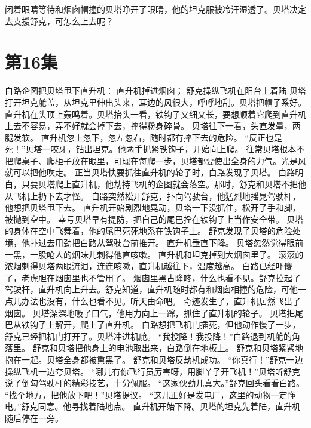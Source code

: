 \documentclass[a4paper,12pt,UTF8,twoside]{ctexbook}
\begin{document}
        闭着眼睛等待和烟囱帽撞的贝塔睁开了眼睛，他的坦克服被冷汗湿透了。贝塔决定去支援舒克，可怎么上去昵？   \chapter{第16集}   
        白路企图把贝塔甩下直升机： 
        直升机掉进烟囱； 
        舒克操纵飞机在阳台上着陆   
        贝塔打开坦克舱盖，从坦克里伸出头来，耳边的风很大，呼呼地刮。贝塔把帽子系好。 
        直升机在头顶上轰鸣着。贝塔抬头一看，铁钩子又细又长，要想顺着它爬到直升机上去不容易，弄不好就会掉下去，摔得粉身碎骨。 
        贝塔往下一看，头直发晕，两腿发软。 
        直升机忽上忽下，忽左忽右，随时都有摔下去的危险。 
        “反正也是死！”贝塔一咬牙，钻出坦克。他两手抓紧铁钩子，开始向上爬。 
        往常贝塔根本不把爬桌子、爬柜子放在眼里，可现在每爬一步，贝塔都要使出全身的力气。光是风就可以把他吹走。 
        正当贝塔快要抓往直升机的轮子时，白路发现了贝塔。 
        白路明白，只要贝塔爬上直升机，他劫持飞机的企图就会落空。那时，舒克和贝塔不把他从飞机上扔下去才怪。 
        自路突然松开舒克，扑向驾驶台，他猛烈地摇晃驾驶杆，他想把贝塔甩下去。 
        直升机开始剧烈地晃动，贝塔一下没抓住，松开了手和脚，被抛到空中。 
        幸亏贝塔早有提防，把自己的尾巴拴在铁钩子上当作安全带。 
        贝塔的身体在空中飞舞着，他的尾巴死死地系在铁钩子上。 
        舒克发现了贝塔的危险处境，他扑过去用劲把白路从驾驶台前推开。 
        直升机垂直下降。 
        贝塔忽然觉得眼前一黑，一股呛人的烟味儿刺得他直咳嗽。 
        直升机和坦克掉到大烟囱里了。 
        滚滚的浓烟刺得贝塔两眼流泪，连连咳嗽，直升机越往下，温度越高。 
        白路已经吓傻了，老虎胆在烟囱里也不管用了。 
        烟囱里黑古隆咚，什么也看不见。舒克拉起了驾驶杆，直升机向上升去。舒克知道，直升机随时都有和烟囱相撞的危险，可他一点儿办法也没有，什么也看不见。听天由命吧。 
        奇迹发生了，直升机居然飞出了烟囱。 
        贝塔深深地吸了口气，他用力向上一蹿，抓住了直升机的轮子。 
        贝塔把尾巴从铁钩子上解开，爬上了直升机。 
        白路想把飞机门插死，但他动作慢了一步，舒克已经把机门打开了。贝塔冲进机舱。 
        “我投降！我投降！”白路退到机舱的角落里。 
        舒克和贝塔把他身上的电池取出来，白路倒在地板上。 
        舒克和贝塔紧紧地抱在一起。贝塔全身都被熏黑了。 
        舒克和贝塔反劫机成功。 
        “你真行！”舒克一边操纵飞机一边夸贝塔。 
        “哪儿有你飞行员厉害呀，用脚丫子开飞机！”贝塔听舒克说了倒勾驾驶杆的精彩技艺，十分佩服。 
        “这家伙劲儿真大。”舒克回头看看白路。 
        “找个地方，把他放下吧！”贝塔提议。 
        “这儿正好是发电厂，这里的动物一定懂电。”舒克同意。他寻找着陆地点。 
        直升机开始下降。贝塔的坦克先着陆，直升机随后停在一旁。 
\end{document}
